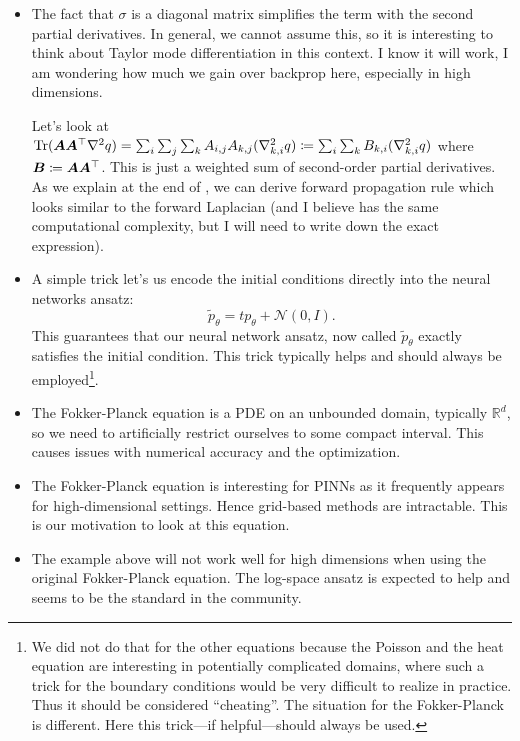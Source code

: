 \begin{itemize}
\item The fact that $\sigma$ is a diagonal matrix simplifies the term with the second partial derivatives. In general, we cannot assume this, so it is interesting to think about Taylor mode differentiation in this context. I know it will work, I am wondering how much we gain over backprop here, especially in high dimensions.

  Let's look at $\operatorname{Tr}({\bm{A}} {\bm{A}}^\top \nabla^2 q) = \sum_i \sum_j \sum_k {A}_{i,j} {A}_{k,j} (\nabla^2_{k,i} q) \coloneqq \sum_i \sum_k {B}_{k,i} (\nabla^2_{k,i} q)$ where ${\bm{B}} \coloneqq {\bm{A}} {\bm{A}}^\top$. This is just a weighted sum of second-order partial derivatives. As we explain at the end of , we can derive forward propagation rule which looks similar to the forward Laplacian (and I believe has the same computational complexity, but I will need to write down the exact expression).


\item A simple trick let's us encode the initial conditions directly into the neural networks ansatz:
  \begin{equation}
    \tilde p_\theta = t p_\theta + \mathcal N(0, I).
  \end{equation}
  This guarantees that our neural network ansatz, now called $\tilde p_\theta$ exactly satisfies the initial condition. This trick typically helps and should always be employed\footnote{We did not do that for the other equations because the Poisson and the heat equation are interesting in potentially complicated domains, where such a trick for the boundary conditions would be very difficult to realize in practice. Thus it should be considered ``cheating''. The situation for the Fokker-Planck is different. Here this trick---if helpful---should always be used.}.
\item The Fokker-Planck equation is a PDE on an unbounded domain, typically $\mathbb R^d$, so we need to artificially restrict ourselves to some compact interval. This causes issues with numerical accuracy and the optimization.
\item The Fokker-Planck equation is interesting for PINNs as it frequently appears for high-dimensional settings. Hence grid-based methods are intractable. This is our motivation to look at this equation.
\item The example above will not work well for high dimensions when using the original Fokker-Planck equation. The log-space ansatz is expected to help and seems to be the standard in the community.
\end{itemize}


